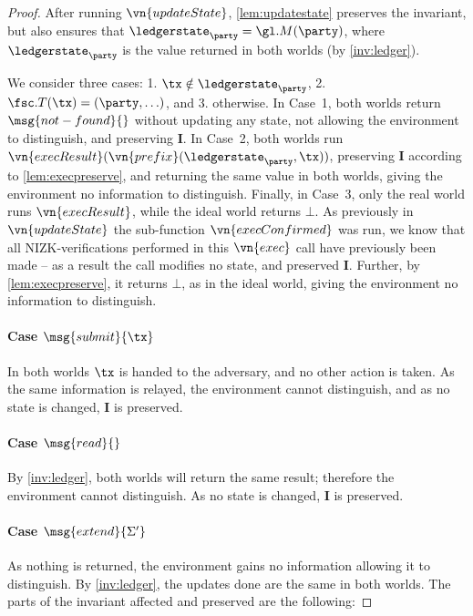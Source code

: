 \begin{proof}
After running $\vn{updateState}$, \autoref{lem:updatestate} preserves the
invariant, but also ensures that $\ledgerstate_\party = \gl.M(\party)$, where
$\ledgerstate_\party$ is the value returned in both worlds (by
\ref{inv:ledger}).

We consider three cases: 1. $\tx \notin \ledgerstate_\party$, 2. $\fsc.T(\tx) =
(\party, \ldots)$, and 3. otherwise. In Case~1, both worlds return
$\allowbreak\msg{not-found}{}$ without updating any state, not allowing the environment to
distinguish, and preserving $\boldsymbol I$. In Case~2, both worlds run
$\vn{execResult}(\vn{prefix}(\ledgerstate_\party, \tx))$, preserving $\boldsymbol I$
according to \autoref{lem:execpreserve}, and returning the same value in both
worlds, giving the environment no information to distinguish. Finally, in
Case~3, only the real world runs $\vn{execResult}$, while the ideal world returns
$\bot$. As previously in $\vn{updateState}$ the sub-function $\vn{execConfirmed}$ was
run, we know that all NIZK-verifications performed in this $\vn{exec}$ call have
previously been made -- as a result the call modifies no state, and preserved
$\boldsymbol I$. Further, by \autoref{lem:execpreserve}, it returns $\bot$, as
in the ideal world, giving the environment no information to distinguish.

\paragraph{Case {\normalfont$\msg{submit}{\tx}$}}

In both worlds $\tx$ is handed to the adversary, and no other action is taken.
As the same information is relayed, the environment cannot distinguish, and as
no state is changed, $\boldsymbol I$ is preserved.

\paragraph{Case {\normalfont$\msg{read}{}$}}

By \ref{inv:ledger}, both worlds will return the same result; therefore the
environment cannot distinguish. As no state is changed, $\boldsymbol I$ is
preserved.

\paragraph{Case {\normalfont$\msg{extend}{\Sigma'}$}}

As nothing is returned, the environment gains no information allowing it to
distinguish. By \ref{inv:ledger}, the updates done are the same in both
worlds. The parts of the invariant affected and preserved are the following:


\end{proof}
